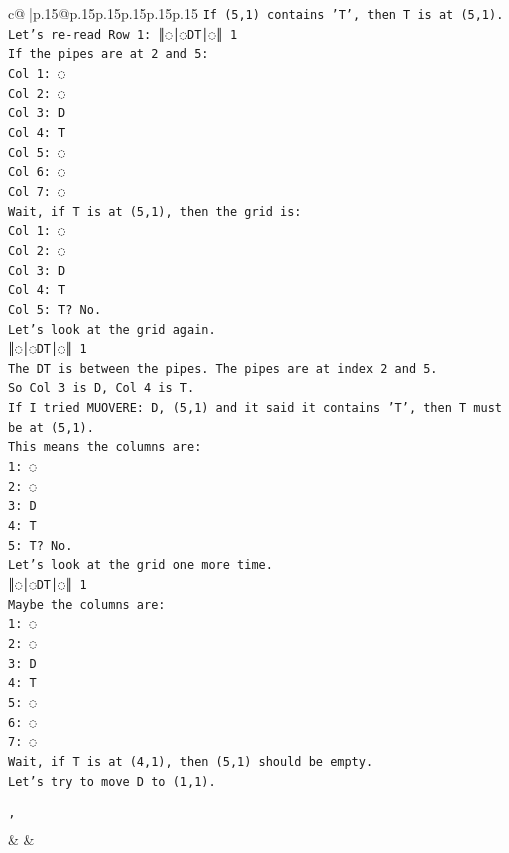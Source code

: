 \documentclass{article}
\begin{document}
{\begin{supertabular}{c@{$\;$}|p{.15\linewidth}@{}p{.15\linewidth}p{.15\linewidth}p{.15\linewidth}p{.15\linewidth}p{.15\linewidth}}
{{{\texttt{If (5,1) contains 'T', then T is at (5,1).} \\
\texttt{Let's re{-}read Row 1: ║◌│◌DT│◌║ 1} \\
\texttt{If the pipes are at 2 and 5:} \\
\texttt{Col 1: ◌} \\
\texttt{Col 2: ◌} \\
\texttt{Col 3: D} \\
\texttt{Col 4: T} \\
\texttt{Col 5: ◌} \\
\texttt{Col 6: ◌} \\
\texttt{Col 7: ◌} \\
\texttt{Wait, if T is at (5,1), then the grid is:} \\
\texttt{Col 1: ◌} \\
\texttt{Col 2: ◌} \\
\texttt{Col 3: D} \\
\texttt{Col 4: T} \\
\texttt{Col 5: T? No.} \\
\texttt{Let's look at the grid again.} \\
\texttt{║◌│◌DT│◌║ 1} \\
\texttt{The DT is between the pipes. The pipes are at index 2 and 5.} \\
\texttt{So Col 3 is D, Col 4 is T.} \\
\texttt{If I tried MUOVERE: D, (5,1) and it said it contains 'T', then T must be at (5,1).} \\
\texttt{This means the columns are:} \\
\texttt{1: ◌} \\
\texttt{2: ◌} \\
\texttt{3: D} \\
\texttt{4: T} \\
\texttt{5: T? No.} \\
\texttt{Let's look at the grid one more time.} \\
\texttt{║◌│◌DT│◌║ 1} \\
\texttt{Maybe the columns are:} \\
\texttt{1: ◌} \\
\texttt{2: ◌} \\
\texttt{3: D} \\
\texttt{4: T} \\
\texttt{5: ◌} \\
\texttt{6: ◌} \\
\texttt{7: ◌} \\
\texttt{Wait, if T is at (4,1), then (5,1) should be empty.} \\
\texttt{Let's try to move D to (1,1).} \\
\\ 
\texttt{'} \\
            }
        }
    }
    & & \\ \\


\end{supertabular}}
\end{document}
